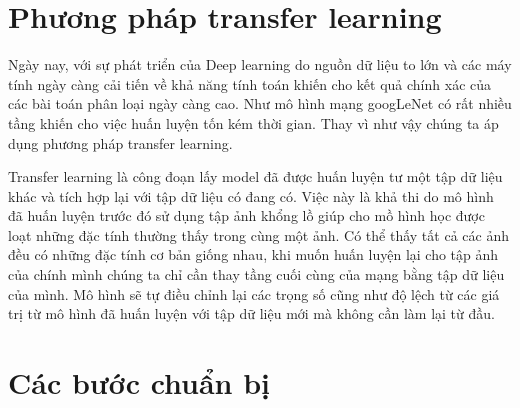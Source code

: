 \section{Phương pháp transfer learning}
	Ngày nay, với sự phát triển của Deep learning do nguồn dữ liệu to lớn và các máy tính ngày càng cải tiến về khả năng tính toán khiến cho kết quả chính xác của các bài toán phân loại ngày càng cao. Như mô hình mạng googLeNet có rất nhiều tầng khiến cho việc huấn luyện tốn kém thời gian. Thay vì như vậy chúng ta áp dụng phương pháp transfer learning.\par
	Transfer learning là công đoạn lấy model đã được huấn luyện tư một tập dữ liệu khác \cite{transfer} và tích hợp lại với tập dữ liệu có đang có. Việc này là khả thi do mô hình đã huấn luyện trước đó sử dụng tập ảnh khổng lồ giúp cho mồ hình học được loạt những đặc tính thường thấy trong cùng một ảnh. Có thể thấy tất cả các ảnh đều có những đặc tính cơ bản giống nhau, khi muốn huấn luyện lại cho tập ảnh của chính mình chúng ta chỉ cần thay tầng cuối cùng của mạng bằng tập dữ liệu của mình. Mô hình sẽ tự điều chỉnh lại các trọng số cũng như độ lệch từ các giá trị từ mô hình đã huấn luyện với tập dữ liệu mới mà không cần làm lại từ đầu.

\section{Các bước chuẩn bị}


